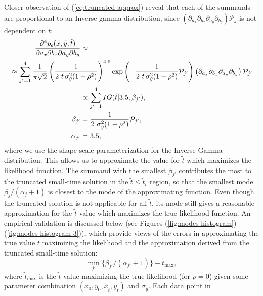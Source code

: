 Closer observation of (\ref{eq:truncated-approx}) reveal that each of
the summands are proportional to an Inverse-gamma distribution, since
$\left(\partial_{a_x}\partial_{b_x} \partial_{a_y}\partial_{b_y}
\right)\mathcal{P}_j$ is not dependent on $\tilde{t}$:
\begin{align*}
  \frac{\partial^4 p_\epsilon(\tilde{x}, \tilde{y}, \tilde{t})}{\partial a_x
  \partial b_x \partial a_y \partial b_y} &\approx \\
   \MoveEqLeft[10] \approx \sum_{j' = 1}^{4} \frac{1}{\pi\sqrt{2}} \left(\frac{1}{2\,\,\tilde{t}\, \sigma_{\tilde{y}}^2 (1-\rho^2)} \right)^{4.5}
                                            \exp\left( -\frac{1}{2\,\,\tilde{t}\, \sigma_{\tilde{y}}^2 (1-\rho^2)} \mathcal{P}_{j'}\right)
  \left(\partial_{a_x}\partial_{b_x} \partial_{a_y}\partial_{b_y} \right)\mathcal{P}_{j'} \\
                                          &\propto \sum_{j' = 1}^{4} IG(\tilde{t} | 3.5, \beta_{j'}), \\ 
 \beta_{j'} &= \frac{1}{2\,\, \sigma_{\tilde{y}}^2 (1-\rho^2)} \mathcal{P}_{j'}, \\
  \alpha_{j'} &= 3.5,
\end{align*}
where we use the shape-scale parameterization for the Inverse-Gamma
distribution. This allows us to approximate the value for $\tilde{t}$
which maximizes the likelihood function. The summand with the smallest
$\beta_{j'}$ contributes the most to the truncated small-time solution
in the $\tilde{t} \leq \tilde{t}_\epsilon$ region, so that the
smallest mode $\beta_j/(\alpha_j+1)$ is closest to the mode of the
approximating function. Even though the truncated solution is not
applicable for all $\tilde{t}$, its mode still gives a reasonable
approximation for the $\tilde{t}$ value which maximizes the true
likelihood function. An empirical validation is discussed below (see
Figures (\ref{fig:modes-histogram}) - (\ref{fig:modes-histogram-3})),
which provide views of the errors in approximating the true value $\tilde{t}$
maximizing the likelihood and the approximation derived from the
truncated small-time solution:
\[ \min_{j'} \{ \beta_{j'}/(\alpha_{j'}+1) \} - \tilde{t}_{\max},
\] where $\tilde{t}_{\max}$ is the $\tilde{t}$ value maximizing the
true likelihood (for $\rho=0$) given some parameter combination
$(\tilde{x}_0, \tilde{y}_0, \tilde{x}_{\tilde{t}},
\tilde{y}_{\tilde{t}})$ and $\sigma_{\tilde{y}}$. Each data point in
